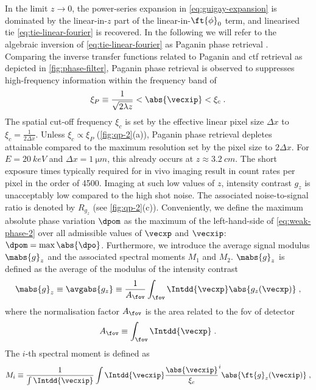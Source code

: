 \documentclass[
twoside,
openright,
titlepage,
numbers=noenddot,
headinclude,
fleqn,
a4paper,
footinclude=true,
cleardoublepage=empty,
abstractoff,
BCOR=5mm,
paper=a4,
fontsize=11pt,
british,ngerman,american,
]{scrreprt}
\begin{document}
In the limit $z\to0$, the power-series expansion in
\cref{eq:guigay-expansion} is dominated by the linear-in-$z$ part of
the linear-in-$\ft{\phi}_0$ term, and  linearised \ac{tie}
\eqref{eq:tie-linear-fourier} is recovered.  In the following we will
refer to the algebraic inversion of \cref{eq:tie-linear-fourier} as
Paganin phase retrieval \cite{PaganinBook}.  Comparing the inverse
transfer functions related to Paganin and \ac{ctf} retrieval as
depicted in \cref{fig:phase-filter}, Paganin phase retrieval is
observed to suppresses high-frequency information within the frequency
band of
\begin{equation}
  \label{eq:paganin-frequency}
  \xi_P\equiv \frac{1}{\sqrt{2\lambda z}} < \abs{\vecxip} < \xi_c \;.
\end{equation}
The spatial cut-off frequency $\xi_c$ is set by the effective linear
pixel size $\Delta x$ to $\xi_c=\frac{1}{2\Delta x}$.  Unless
$\xi_c\propto\xi_P$ (\cref{fig:qp-2}(a)), Paganin phase retrieval
depletes attainable compared to the maximum resolution set by the
pixel size to $2\Delta x$.  For $E=\SI{20}{keV}$ and $\Delta
x=\SI{1}{\micro m}$, this already occurs at $z\approx\SI{3.2}{cm}$.
The short exposure times typically required for in vivo imaging result
in count rates per pixel in the order of 4500.  Imaging at such low
values of $z$, intensity contrast $g_z$ is unacceptably low compared
to the high shot noise.  The associated noise-to-signal ratio is
denoted by $R_{g_z}$ (see \cref{fig:qp-2}(c)).  Conveniently, we
define the maximum absolute phase variation $\dpom$ as the maximum of
the left-hand-side of \cref{eq:weak-phase-2} over all admissible
values of $\vecxp$ and $\vecxip$: $\dpom = \max{\abs{\dpo}}$.
Furthermore, we introduce the average signal modulus $\mabs{g}_z$ and
the associated spectral moments $M_1$ and $M_2$.  $\mabs{g}_z$ is
defined as the average of the modulus of the intensity contrast
\begin{equation}
  \label{eq:mean-abs-g}
  \mabs{g}_z \equiv \avgabs{g_z} \equiv 
  \frac{1}{A_\fov} \int_{\fov}\Intdd{\vecxp}\abs{g_z(\vecxp)}\;,
\end{equation}
where the normalisation factor $A_\fov$ is the area related to the
\acf{fov} of detector
\begin{equation}
  \label{eq:afov}
  A_\fov \equiv \int_{\fov}\Intdd{\vecxp} \;.
\end{equation}
The $i$-th spectral moment is defined as
\begin{equation}
  \label{eq:spectral-moments}
  M_i \equiv \frac{1}{\int\Intdd{\vecxip}} \int\Intdd{\vecxip}
   \frac{\abs{\vecxip}}{\xi_c}^i \abs{\ft{g}_z(\vecxip)} \;,
\end{equation}
\end{document}
